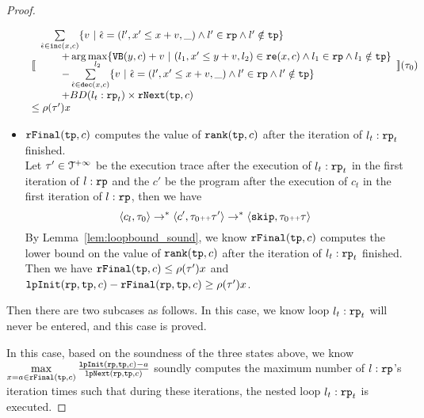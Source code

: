 \begin{proof}
\begin{itemize}
\[\begin{array}{l}
      \econfig{
          \begin{array}{l}
            \sum\limits_{\absevent \in \inc(x, c) }
            \left\{ 
            v ~\middle\vert~ \absevent = (l', x' \leq x + v, \_) \land  l' \in \rprog 
            \land l' \notin \tpath \right\}
            \\ \qquad 
            + \arg\max\limits_{l_2 }
                \left\{ \varinvar(y, c) + v ~\middle\vert~ 
                (l_1, x' \leq y + v, l_2) \in \reset(x, c) \land l_1 \in \rprog \land l_1 \notin \tpath\right\}
            \\ \qquad 
            - \sum\limits_{ \absevent \in \dec(x, c) }\left\{ 
            v 
            ~\middle\vert~ \absevent = (l', x' \leq x + v, \_) \land l' \in \rprog \land l' \notin \tpath \right\}
            \\ \qquad 
            + BD(l_t: \rprog_t) \times \rfnext(\tpath, c)
          \end{array}
      }(\trace_0) \\
      \leq \env(\trace') x
    \end{array}
    \]
  \item $\mathtt{rFinal}(\mathtt{tp}, c)$ computes the value of $\mathtt{rank}(\mathtt{tp}, c)$ after the iteration of $l_t:\mathtt{rp}_t$ finished.
  \\
  Let $\mathtt{\tau}' \in \mathcal{T}^{+\infty}$ be the execution trace after the execution of $l_t: \mathtt{rp}_t$ in the first iteration of $l:\mathtt{rp}$ and the $c'$ be the program after the execution of $c_t$ in the first iteration of $l:\mathtt{rp}$,  then we have
  \[
    \langle c_l, \mathtt{\tau}_0 \rangle \to^* \langle c', \mathtt{\tau}_0 {\scriptscriptstyle ++} \mathtt{\tau}' \rangle \to^* \langle \mathtt{skip}, \mathtt{\tau}_0 {\scriptscriptstyle ++} \mathtt{\tau} \rangle
  \]
  By Lemma~\ref{lem:loopbound_sound}, we know $\mathtt{rFinal}(\mathtt{tp}, c)$ computes the lower bound on the value of $\mathtt{rank}(\mathtt{tp}, c)$ after the iteration of $l_t:\mathtt{rp}_t$ finished.
  \\
  Then we have 
  $\mathtt{rFinal}(\mathtt{tp}, c) \leq \rho(\mathtt{\tau}') x$ and $\mathtt{lpInit}(\mathtt{rp}, \mathtt{tp}, c) - \mathtt{rFinal}(\mathtt{rp}, \mathtt{tp}, c) \geq \rho(\mathtt{\tau}') x$.
\end{itemize}
Then there are two subcases as follows.
In this case, we know loop $l_t: \mathtt{rp}_t$ will never be entered, and this case is proved.

In this case, based on the soundness of the three states above, we know 
$
  \max\limits_{x = a \in \mathtt{rFinal}(\mathtt{tp}, c)}
  \frac{\mathtt{lpInit}(\mathtt{rp}, \mathtt{tp}, c) - a }{\mathtt{lpNext}(\mathtt{rp}, \mathtt{tp}, c)}
$
soundly computes the maximum number of $l: \mathtt{rp}$'s iteration times such that during these iterations, the nested loop $l_t: \mathtt{rp}_t$ is executed.


\end{proof}
